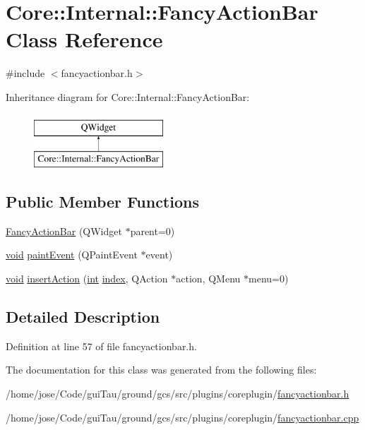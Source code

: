 \hypertarget{class_core_1_1_internal_1_1_fancy_action_bar}{\section{Core\-:\-:Internal\-:\-:Fancy\-Action\-Bar Class Reference}
\label{class_core_1_1_internal_1_1_fancy_action_bar}
}


{\ttfamily \#include $<$fancyactionbar.\-h$>$}

Inheritance diagram for Core\-:\-:Internal\-:\-:Fancy\-Action\-Bar\-:\begin{figure}[H]
\begin{center}
\leavevmode
\includegraphics[height=2.000000cm]{class_core_1_1_internal_1_1_fancy_action_bar}
\end{center}
\end{figure}
\subsection*{Public Member Functions}
\begin{DoxyCompactItemize}
\item 
\hyperlink{group___core_plugin_ga40b9918da1dd0a7ece833e77d449d9c2}{Fancy\-Action\-Bar} (Q\-Widget $\ast$parent=0)
\item 
\hyperlink{group___u_a_v_objects_plugin_ga444cf2ff3f0ecbe028adce838d373f5c}{void} \hyperlink{group___core_plugin_ga26e1ead061e5f61ec28fc34396a30888}{paint\-Event} (Q\-Paint\-Event $\ast$event)
\item 
\hyperlink{group___u_a_v_objects_plugin_ga444cf2ff3f0ecbe028adce838d373f5c}{void} \hyperlink{group___core_plugin_gade6a7945157491cf978f90f69dd90cb8}{insert\-Action} (\hyperlink{ioapi_8h_a787fa3cf048117ba7123753c1e74fcd6}{int} \hyperlink{glext_8h_ab47dd9958bcadea08866b42bf358e95e}{index}, Q\-Action $\ast$action, Q\-Menu $\ast$menu=0)
\end{DoxyCompactItemize}


\subsection{Detailed Description}


Definition at line 57 of file fancyactionbar.\-h.



The documentation for this class was generated from the following files\-:\begin{DoxyCompactItemize}
\item 
/home/jose/\-Code/gui\-Tau/ground/gcs/src/plugins/coreplugin/\hyperlink{fancyactionbar_8h}{fancyactionbar.\-h}\item 
/home/jose/\-Code/gui\-Tau/ground/gcs/src/plugins/coreplugin/\hyperlink{fancyactionbar_8cpp}{fancyactionbar.\-cpp}\end{DoxyCompactItemize}
